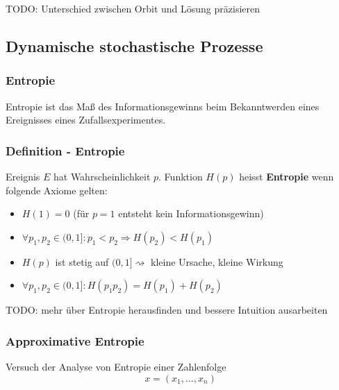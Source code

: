 \documentclass[a4paper]{article}
\begin{document}
TODO: Unterschied zwischen Orbit und Lösung präzisieren

\subsection{Dynamische stochastische Prozesse}

\subsubsection{Entropie}
Entropie ist das Maß des Informationsgewinns beim Bekanntwerden eines
Ereignisses eines Zufallsexperimentes.

\subsubsection*{Definition - Entropie}
Ereignis $E$ hat Wahrscheinlichkeit $p$. Funktion $H(p)$ heisst \textbf{Entropie}
wenn folgende Axiome gelten:

\begin{itemize}
	\item $H(1) = 0$ (für $p = 1$ entsteht kein Informationsgewinn)
	\item $\forall p_1, p_2 \in (0, 1]: p_1 < p_2 \Rightarrow H(p_2) < H(p_1)$
	\item $H(p)$ ist stetig auf $(0, 1] \rightsquigarrow$ 
		kleine Ursache, kleine Wirkung
	\item $\forall p_1, p_2 \in (0, 1]: H(p_1 p_2) = H(p_1) + H(p_2)$
\end{itemize}

TODO: mehr über Entropie herausfinden und bessere Intuition ausarbeiten

\subsubsection{Approximative Entropie}
Versuch der Analyse von Entropie einer Zahlenfolge
\[
x = \left(
	x_1, ..., x_{n}
\right) 
\] 
\end{document}

